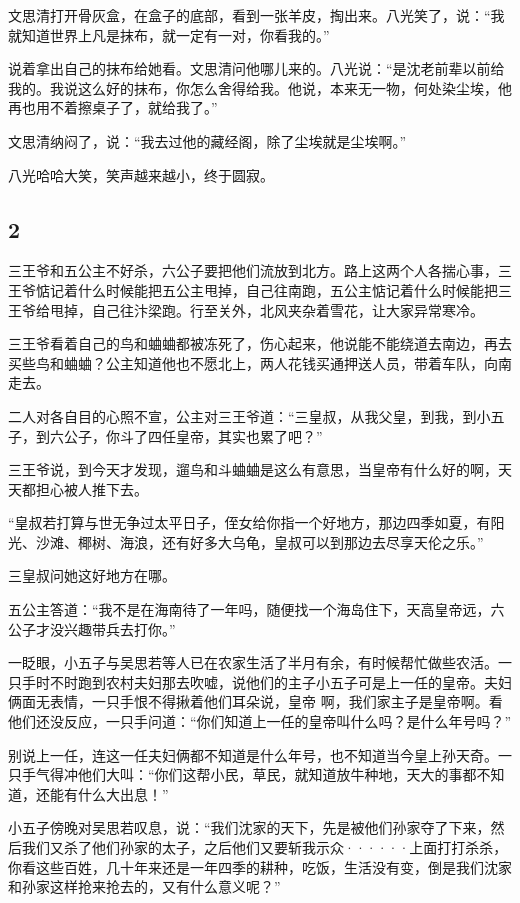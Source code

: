 文思清打开骨灰盒，在盒子的底部，看到一张羊皮，掏出来。八光笑了，说：“我就知道世界上凡是抹布，就一定有一对，你看我的。”

说着拿出自己的抹布给她看。文思清问他哪儿来的。八光说：“是沈老前辈以前给我的。我说这么好的抹布，你怎么舍得给我。他说，本来无一物，何处染尘埃，他再也用不着擦桌子了，就给我了。”

文思清纳闷了，说：“我去过他的藏经阁，除了尘埃就是尘埃啊。”

八光哈哈大笑，笑声越来越小，终于圆寂。
\newline

{\centering\subsection{2}}

三王爷和五公主不好杀，六公子要把他们流放到北方。路上这两个人各揣心事，三王爷惦记着什么时候能把五公主甩掉，自己往南跑，五公主惦记着什么时候能把三王爷给甩掉，自己往汴梁跑。行至关外，北风夹杂着雪花，让大家异常寒冷。

三王爷看着自己的鸟和蛐蛐都被冻死了，伤心起来，他说能不能绕道去南边，再去买些鸟和蛐蛐？公主知道他也不愿北上，两人花钱买通押送人员，带着车队，向南走去。

二人对各自目的心照不宣，公主对三王爷道：“三皇叔，从我父皇，到我，到小五子，到六公子，你斗了四任皇帝，其实也累了吧？”

三王爷说，到今天才发现，遛鸟和斗蛐蛐是这么有意思，当皇帝有什么好的啊，天天都担心被人推下去。

“皇叔若打算与世无争过太平日子，侄女给你指一个好地方，那边四季如夏，有阳光、沙滩、椰树、海浪，还有好多大乌龟，皇叔可以到那边去尽享天伦之乐。”

三皇叔问她这好地方在哪。

五公主答道：“我不是在海南待了一年吗，随便找一个海岛住下，天高皇帝远，六公子才没兴趣带兵去打你。”
\newline

一眨眼，小五子与吴思若等人已在农家生活了半月有余，有时候帮忙做些农活。一只手时不时跑到农村夫妇那去吹嘘，说他们的主子小五子可是上一任的皇帝。夫妇俩面无表情，一只手恨不得揪着他们耳朵说，皇帝
啊，我们家主子是皇帝啊。看他们还没反应，一只手问道：“你们知道上一任的皇帝叫什么吗？是什么年号吗？”

别说上一任，连这一任夫妇俩都不知道是什么年号，也不知道当今皇上孙天奇。一只手气得冲他们大叫：“你们这帮小民，草民，就知道放牛种地，天大的事都不知道，还能有什么大出息！”

小五子傍晚对吴思若叹息，说：“我们沈家的天下，先是被他们孙家夺了下来，然后我们又杀了他们孙家的太子，之后他们又要斩我示众······上面打打杀杀，你看这些百姓，几十年来还是一年四季的耕种，吃饭，生活没有变，倒是我们沈家和孙家这样抢来抢去的，又有什么意义呢？”
\newline


